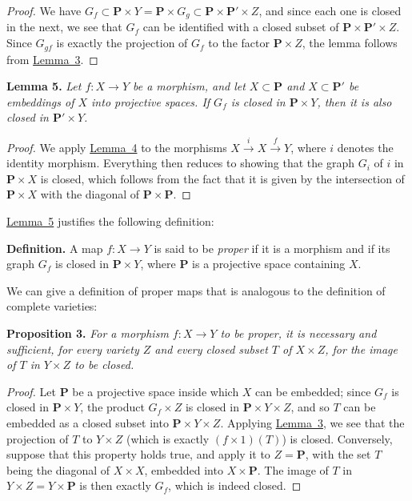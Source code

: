 \documentclass{article}
\newenvironment{itenv}[1]
  {\phantomsection\par\medskip\noindent\textbf{#1.}\itshape}
  {\par\medskip}
\newenvironment{rmenv}[1]
  {\phantomsection\par\medskip\noindent\textbf{#1.}\rmfamily}
  {\par\medskip}
\newcommand{\PP}{\mathbf{P}}
\newcommand{\oldpage}[1]{\marginpar{\footnotesize$\Big\vert$ \textit{p.~#1}}}
\begin{document}
\begin{proof}
  We have $G_f \subset \PP\times Y = \PP\times G_g \subset \PP\times \PP'\times Z$, and since each one is closed in the next, we see that $G_f$ can be identified with a closed subset of $\PP\times \PP'\times Z$.
  Since $G_{gf}$ is exactly the projection of $G_f$ to the factor $\PP\times Z$, the lemma follows from \hyperref[lemma3]{Lemma~3}.
\end{proof}

\begin{itenv}{Lemma 5}
\label{lemma5}
  Let $f\colon X\to Y$ be a morphism, and let $X\subset \PP$ and $X\subset \PP'$ be embeddings of $X$ into projective spaces.
  If $G_f$ is closed in $\PP\times Y$, then it is also closed in $\PP'\times Y$.
\end{itenv}

\begin{proof}
  We apply \hyperref[lemma4]{Lemma~4} to the morphisms $X\xrightarrow{i}X\xrightarrow{f}Y$, where $i$ denotes the identity morphism.
  Everything then reduces to showing that the graph $G_i$ of $i$ in $\PP\times X$ is closed, which follows from the fact that it is given by the intersection of $\PP\times X$ with the diagonal of $\PP\times \PP$.
\end{proof}

\hyperref[lemma5]{Lemma~5} justifies the following definition:

\begin{rmenv}{Definition}
  A map $f\colon X\to Y$ is said to be \emph{proper} if it is a morphism and if its graph $G_f$ is closed in $\PP\times Y$, where $\PP$ is a projective space containing $X$.
\end{rmenv}

We can give a definition of proper maps that is analogous to the definition of complete varieties:

\begin{itenv}{Proposition 3}
\label{proposition3}
  For a morphism $f\colon X\to Y$ to be proper, it is necessary and sufficient, for every variety $Z$ and every closed subset $T$ of $X\times Z$, for the image of $T$ in $Y\times Z$ to be closed.
\end{itenv}

\begin{proof}
  Let $\PP$ be a projective space inside which $X$ can be embedded;
  since $G_f$ is closed in $\PP\times Y$, the product $G_f\times Z$ is closed in $\PP\times Y\times Z$, and so $T$ can be embedded as a closed subset into $\PP\times Y\times Z$.
\oldpage{101}
  Applying \hyperref[lemma3]{Lemma~3}, we see that the projection of $T$ to $Y\times Z$ (which is exactly $(f\times1)(T)$) is closed.
  Conversely, suppose that this property holds true, and apply it to $Z=\PP$, with the set $T$ being the diagonal of $X\times X$, embedded into $X\times \PP$.
  The image of $T$ in $Y\times Z=Y\times \PP$ is then exactly $G_f$, which is indeed closed.
\end{proof}
\end{document}
